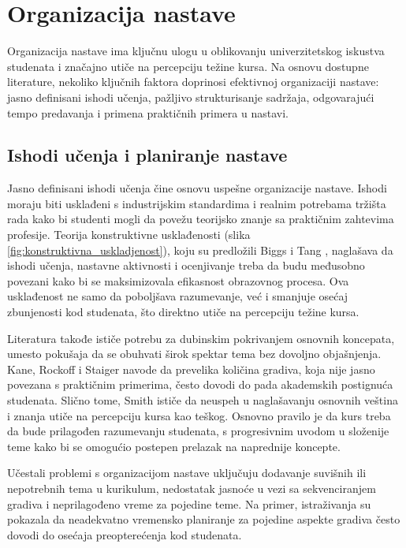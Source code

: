 \documentclass[a4paper]{article}
\begin{document}
\section{Organizacija nastave}
Organizacija nastave ima ključnu ulogu u oblikovanju univerzitetskog iskustva studenata i
značajno utiče na percepciju težine kursa. Na osnovu dostupne literature, nekoliko ključnih
faktora doprinosi efektivnoj organizaciji nastave: jasno definisani ishodi učenja, pažljivo
strukturisanje sadržaja, odgovarajući tempo predavanja i primena praktičnih primera u
nastavi.

\subsection{Ishodi učenja i planiranje nastave}
Jasno definisani ishodi učenja čine osnovu uspešne organizacije nastave. Ishodi moraju biti
usklađeni s industrijskim standardima i realnim potrebama tržišta rada kako bi studenti mogli
da povežu teorijsko znanje sa praktičnim zahtevima profesije. Teorija konstruktivne
usklađenosti (slika \ref{fig:konstruktivna_uskladjenost}), koju su predložili Biggs i Tang \cite{biggs2007teaching}, naglašava da ishodi učenja, nastavne
aktivnosti i ocenjivanje treba da budu međusobno povezani kako bi se maksimizovala
efikasnost obrazovnog procesa. Ova usklađenost ne samo da poboljšava razumevanje, već i
smanjuje osećaj zbunjenosti kod studenata, što direktno utiče na percepciju težine kursa.

Literatura takođe ističe potrebu za dubinskim pokrivanjem osnovnih koncepata, umesto
pokušaja da se obuhvati širok spektar tema bez dovoljno objašnjenja. Kane, Rockoff i
Staiger \cite{kane2006certification} navode da prevelika količina gradiva, koja nije jasno povezana s praktičnim
primerima, često dovodi do pada akademskih postignuća studenata. Slično tome, Smith
\cite{smith2009simulation} ističe da neuspeh u naglašavanju osnovnih veština i znanja utiče na percepciju kursa
kao teškog. Osnovno pravilo je da kurs treba da bude prilagođen razumevanju
studenata, s progresivnim uvodom u složenije teme kako bi se omogućio postepen prelazak
na naprednije koncepte.

Učestali problemi s organizacijom nastave uključuju dodavanje suvišnih ili nepotrebnih
tema u kurikulum, nedostatak jasnoće u vezi sa sekvenciranjem gradiva i neprilagođeno
vreme za pojedine teme. Na primer, istraživanja su pokazala da neadekvatno vremensko
planiranje za pojedine aspekte gradiva često dovodi do osećaja preopterećenja kod
studenata.
\end{document}
